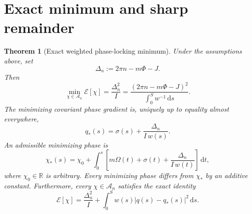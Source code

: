 \documentclass[11pt]{article}
\newtheorem{theorem}{Theorem}
\newcommand{\dd}{\,\mathrm{d}}
\newcommand{\RR}{\mathbb{R}}
\newcommand{\E}{\mathcal{E}}
\begin{document}
\section{Exact minimum and sharp remainder}

\begin{theorem}[Exact weighted phase-locking minimum]
\label{thm:main}
Under the assumptions above, set
\begin{equation}
  \Delta_n:=2\pi n-m\Phi-J.
  \label{eq:delta}
\end{equation}
Then
\begin{equation}
  \boxed{\displaystyle
  \min_{\chi\in\mathcal{A}_n}\E[\chi]
  =\frac{\Delta_n^2}{I}
  =\frac{(2\pi n-m\Phi-J)^2}{\displaystyle\int_0^S w^{-1}\dd s}.}
  \label{eq:minimum}
\end{equation}
The minimizing covariant phase gradient is, uniquely up to equality almost
everywhere,
\begin{equation}
  \boxed{\displaystyle
  q_*(s)=\sigma(s)+\frac{\Delta_n}{I\,w(s)}.}
  \label{eq:qstar}
\end{equation}
An admissible minimizing phase is
\begin{equation}
  \boxed{\displaystyle
  \chi_*(s)=\chi_0+\int_0^s
  \left[m\Omega(t)+\sigma(t)+\frac{\Delta_n}{I\,w(t)}\right]\dd t,}
  \label{eq:chistar}
\end{equation}
where $\chi_0\in\RR$ is arbitrary.  Every minimizing phase differs from
$\chi_*$ by an additive constant.  Furthermore, every
$\chi\in\mathcal{A}_n$ satisfies the exact identity
\begin{equation}
  \boxed{\displaystyle
  \E[\chi]
  =\frac{\Delta_n^2}{I}
   +\int_0^S w(s)\lvert q(s)-q_*(s)\rvert^2\dd s.}
  \label{eq:remainder}
\end{equation}
\end{theorem}
\end{document}
